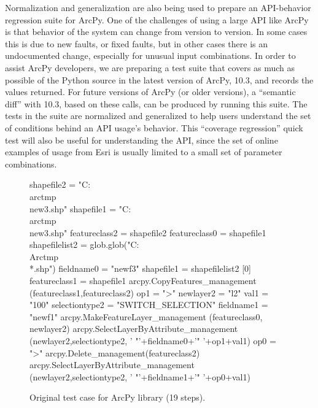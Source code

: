 Normalization and generalization are also being used to prepare an
API-behavior regression suite for ArcPy.  One of the challenges of
using a large API like ArcPy is that behavior of the system can change
from version to version.  In some cases this is due to new faults, or
fixed faults, but in other cases there is an undocumented change,
especially for unusual input combinations.  In order to assist ArcPy
developers, we are preparing a test suite that covers as much as
possible of the Python source in the latest version of ArcPy, 10.3,
and records the values returned.  For future versions of ArcPy (or
older versions), a ``semantic diff'' with 10.3, based on these calls,
can be produced by running this suite.  The tests in the suite are
normalized and generalized to help users understand the set of
conditions behind an API usage's behavior.  This ``coverage
regression'' quick test \cite{icst2014} will also be
useful for understanding  the API, since the set of online examples of usage
from Esri is usually limited to a small set of parameter combinations.

\begin{figure}
{\scriptsize 
\begin{code}
shapefile2 = "C:\\arctmp\\new3.shp" 
shapefile1 = "C:\\arctmp\\new3.shp" 
featureclass2 = shapefile2 
featureclass0 = shapefile1 
shapefilelist2 = 
   glob.glob("C:\\Arctmp\\*.shp") 
fieldname0 = "newf3" 
shapefile1 = shapefilelist2 [0] 
featureclass1 = shapefile1 
arcpy.CopyFeatures\_management
   (featureclass1,featureclass2) 
op1 = ">" 
newlayer2 = "l2" 
val1 = "100" 
selectiontype2 = "SWITCH\_SELECTION" 
fieldname1 = "newf1" 
arcpy.MakeFeatureLayer\_management
   (featureclass0, newlayer2) 
arcpy.SelectLayerByAttribute\_management
   (newlayer2,selectiontype2,
   ' "'+fieldname0+'" '+op1+val1) 
op0 = ">" 
arcpy.Delete\_management(featureclass2) 
arcpy.SelectLayerByAttribute\_management
   (newlayer2,selectiontype2,
   ' "'+fieldname1+'" '+op0+val1) 
\end{code}
}
\caption{Original test case for ArcPy library (19 steps).}
\label{esriorig}
\end{figure}

